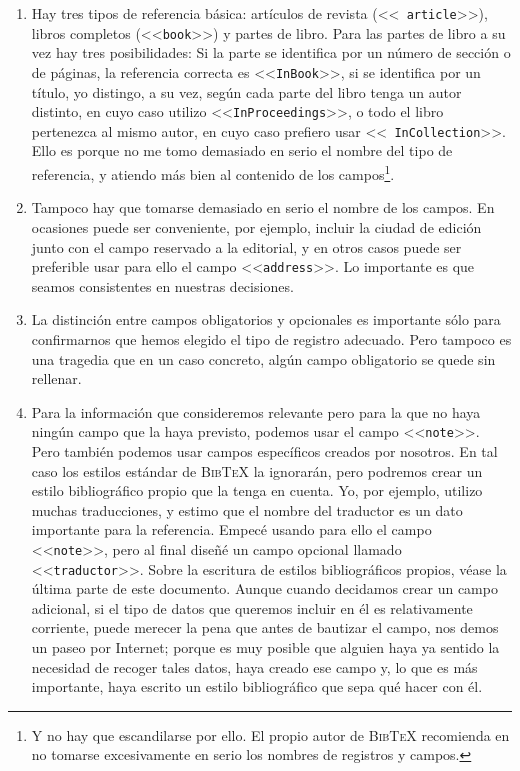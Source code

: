 \documentclass[a4paper,11pt]{article}
\def\btx-{\textsc{Bib\TeX}}
\def\ltr#1-{<<\texttt{#1}>>}
\begin{document}
\begin{enumerate}

\item  Hay  tres  tipos  de  referencia básica:  artículos  de  revista  (\ltr
  article-), libros completos (\ltr book-) y partes de libro.  Para las partes
  de libro a su  vez hay tres posibilidades: Si la parte  se identifica por un
  número de sección  o de páginas, la referencia correcta  es \ltr InBook-, si
  se identifica  por un título,  yo distingo, a  su vez, según cada  parte del
  libro tenga un  autor distinto, en cuyo caso  utilizo \ltr InProceedings-, o
  todo el  libro pertenezca al  mismo autor, en  cuyo caso prefiero  usar \ltr
  InCollection-. Ello  es porque no me  tomo demasiado en serio  el nombre del
  tipo de referencia, y atiendo más bien al contenido de los campos\footnote{Y
    no hay que escandilarse por ello.   El propio autor de \btx- recomienda en
    \cite{patashnik88}  no  tomarse  excesivamente  en serio  los  nombres  de
    registros y campos.  }.

\item Tampoco hay  que tomarse demasiado en serio el nombre  de los campos. En
  ocasiones puede ser  conveniente, por ejemplo, incluir la  ciudad de edición
  junto con  el campo  reservado a la  editorial, y  en otros casos  puede ser
  preferible  usar para ello  el campo  \ltr address-.   Lo importante  es que
  seamos consistentes en nuestras decisiones.

\item La distinción entre campos  obligatorios y opcionales es importante sólo
  para  confirmarnos que  hemos elegido  el tipo  de registro  adecuado.  Pero
  tampoco es una tragedia que en  un caso concreto, algún campo obligatorio se
  quede sin rellenar.

\item Para la información que consideremos  relevante pero para la que no haya
  ningún campo que  la haya previsto, podemos usar el  campo \ltr note-.  Pero
  también podemos usar  campos específicos creados por nosotros.   En tal caso
  los estilos  estándar de \btx- la  ignorarán, pero podremos  crear un estilo
  bibliográfico propio que la tenga en cuenta. Yo, por ejemplo, utilizo muchas
  traducciones, y  estimo que  el nombre del  traductor es un  dato importante
  para la  referencia.  Empecé usando para  ello el campo \ltr  note-, pero al
  final diseñé un campo opcional  llamado \ltr traductor-.  Sobre la escritura
  de estilos bibliográficos propios, véase  la última parte de este documento.
  Aunque cuando  decidamos crear un campo  adicional, si el tipo  de datos que
  queremos incluir en él es relativamente corriente, puede merecer la pena que
  antes de bautizar  el campo, nos demos un paseo por  Internet; porque es muy
  posible que  alguien haya  ya sentido la  necesidad de recoger  tales datos,
  haya creado  ese campo y, lo que  es más importante, haya  escrito un estilo
  bibliográfico que sepa qué hacer con él.


\end{enumerate}
\end{document}
